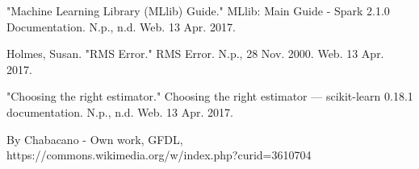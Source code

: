 \documentclass[9pt,twocolumn,twoside]{idsi}
\begin{document}
\begin{thebibliography}{9}

"Machine Learning Library (MLlib) Guide." MLlib: Main Guide - Spark 2.1.0 Documentation. N.p., n.d. Web. 13 Apr. 2017.
 
Holmes, Susan. "RMS Error." RMS Error. N.p., 28 Nov. 2000. Web. 13 Apr. 2017.
 
"Choosing the right estimator." Choosing the right estimator — scikit-learn 0.18.1 documentation. N.p., n.d. Web. 13 Apr. 2017.

By Chabacano - Own work, GFDL, https://commons.wikimedia.org/w/index.php?curid=3610704

\end{thebibliography}
\end{document}
